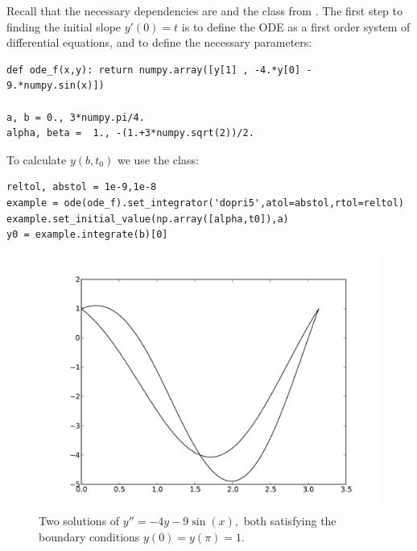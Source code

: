 
Recall that the necessary dependencies are  and the  class from \newline {}. The first step to finding the initial slope $y'(0) = t$ is to define the ODE as a first order system of differential equations, and to define the necessary parameters:
\begin{lstlisting}
def ode_f(x,y): return numpy.array([y[1] , -4.*y[0] - 9.*numpy.sin(x)])

a, b = 0., 3*numpy.pi/4.
alpha, beta =  1., -(1.+3*numpy.sqrt(2))/2.

\end{lstlisting}
To calculate $y(b,t_0)$ we use the  class: 
\begin{lstlisting}
reltol, abstol = 1e-9,1e-8
example = ode(ode_f).set_integrator('dopri5',atol=abstol,rtol=reltol) 
example.set_initial_value(np.array([alpha,t0]),a) 
y0 = example.integrate(b)[0]
\end{lstlisting}

\begin{figure}[ht]
\centering
\includegraphics[width=\textwidth]{Fig1.pdf}
\caption{Two solutions of $y'' = -4y -9\sin(x),$ both satisfying the boundary conditions $y(0) = y(\pi) = 1.$}
\label{shooting:prob2}
\end{figure}

